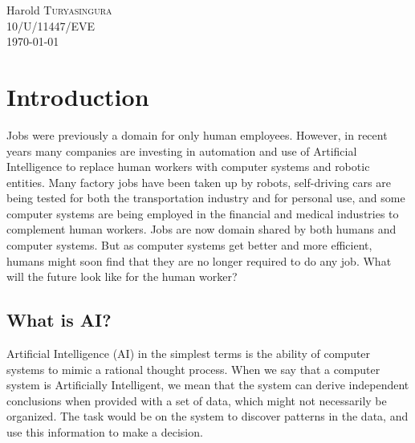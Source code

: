\documentclass[12pt, a4paper]{report}
\begin{document}
\begin{titlepage}

\large
Harold \textsc{Turyasingura}\\
\textsc{10/U/11447/EVE}\\[3cm] %

{\large \today}

\vfill

\end{titlepage}

\tableofcontents
\newpage

\sectionfont{\scshape}
\section*{Introduction}
Jobs were previously a domain for only human employees. However, in recent years many
companies are investing in automation and use of Artificial Intelligence to replace human
workers with computer systems and robotic entities. Many factory jobs have been taken up
by robots, self-driving cars are being tested for both the transportation industry and for
personal use, and some computer systems are being employed in the financial and medical
industries to complement human workers. Jobs are now domain shared by both humans and
computer systems. But as computer systems get better and more efficient, humans might soon
find that they are no longer required to do any job. What will the future look like for
the human worker?\\

\subsection*{What is AI?}
Artificial Intelligence (AI) in the simplest terms is the ability of computer systems to mimic a
rational thought process. When we say that a computer system is Artificially Intelligent,
we mean that the system can derive independent conclusions when provided with a set of
data, which might not necessarily be organized. The task would be on the system to discover
patterns in the data, and use this information to make a decision.\\
\end{document}
